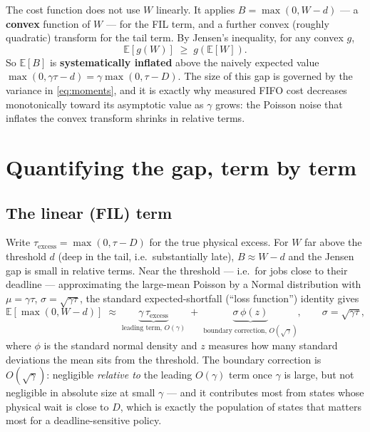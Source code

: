 \documentclass[11pt,a4paper]{article}
\newcommand{\E}{\mathbb{E}}
\begin{document}
The cost function does not use $W$ linearly.  It applies
$B = \max(0, W - d)$ --- a \textbf{convex} function of $W$ --- for the FIL
term, and a further convex (roughly quadratic) transform for the tail term.
By Jensen's inequality, for any convex $g$,
\begin{equation}
  \E[g(W)] \;\geq\; g(\E[W]).
  \label{eq:jensen}
\end{equation}
So $\E[B]$ is \textbf{systematically inflated} above the naively expected
value $\max(0,\gamma\tau - d) = \gamma\max(0,\tau - D)$.  The size of this gap
is governed by the variance in \eqref{eq:moments}, and it is exactly why
measured FIFO cost decreases monotonically toward its asymptotic value as
$\gamma$ grows: the Poisson noise that inflates the convex transform shrinks
in relative terms.

\section{Quantifying the gap, term by term}

\subsection{The linear (FIL) term}

Write $\tau_{\text{excess}} = \max(0, \tau - D)$ for the true physical excess.
For $W$ far above the threshold $d$ (deep in the tail, i.e.\ substantially
late), $B \approx W - d$ and the Jensen gap is small in relative terms.  Near
the threshold --- i.e.\ for jobs close to their deadline --- approximating the
large-mean Poisson by a Normal distribution with
$\mu = \gamma\tau$, $\sigma = \sqrt{\gamma\tau}$, the standard expected-shortfall
(``loss function'') identity gives
\begin{equation}
  \E[\max(0, W - d)]
  \;\approx\;
  \underbrace{\gamma\,\tau_{\text{excess}}}_{\text{leading term, } O(\gamma)}
  \;+\;
  \underbrace{\sigma\,\phi(z)}_{\text{boundary correction, } O(\sqrt{\gamma})},
  \qquad \sigma = \sqrt{\gamma\tau},
  \label{eq:loss-fn}
\end{equation}
where $\phi$ is the standard normal density and $z$ measures how many standard
deviations the mean sits from the threshold.  The boundary correction is
$O(\sqrt\gamma)$: negligible \emph{relative to} the leading $O(\gamma)$ term
once $\gamma$ is large, but not negligible in absolute size at small $\gamma$
--- and it contributes most from states whose physical wait is close to $D$,
which is exactly the population of states that matters most for a
deadline-sensitive policy.
\end{document}
